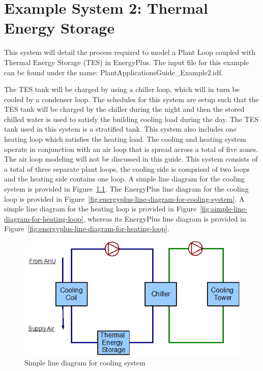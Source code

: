 \chapter{Example System 2: Thermal Energy Storage}\label{example-system-2-thermal-energy-storage}

This system will detail the process required to model a Plant Loop coupled with Thermal Energy Storage (TES) in EnergyPlus. The input file for this example can be found under the name: PlantApplicationsGuide\_Example2.idf.

The TES tank will be charged by using a chiller loop, which will in turn be cooled by a condenser loop. The schedules for this system are setup such that the TES tank will be charged by the chiller during the night and then the stored chilled water is used to satisfy the building cooling load during the day. The TES tank used in this system is a stratified tank. This system also includes one heating loop which satisfies the heating load. The cooling and heating system operate in conjunction with an air loop that is spread across a total of five zones. The air loop modeling will not be discussed in this guide. This system consists of a total of three separate plant loops, the cooling side is comprised of two loops and the heating side contains one loop. A simple line diagram for the cooling system is provided in Figure~\ref{fig:simple-line-diagram-for-cooling-system}. The EnergyPlus line diagram for the cooling loop is provided in Figure~\ref{fig:energyplus-line-diagram-for-cooling-system}. A simple line diagram for the heating loop is provided in Figure~\ref{fig:simple-line-diagram-for-heating-loop}, whereas its EnergyPlus line diagram is provided in Figure~\ref{fig:energyplus-line-diagram-for-heating-loop}.

\begin{figure}[htbp] %
\centering
\includegraphics{media/image041.png}
\caption{Simple line diagram for cooling system \protect \label{fig:simple-line-diagram-for-cooling-system}}
\end{figure}

